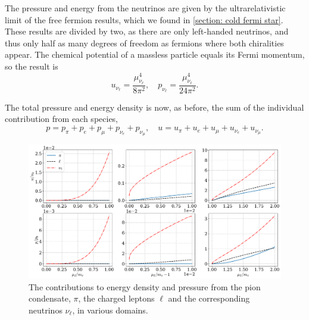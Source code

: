 The pressure and energy from the neutrinos are given by the ultrarelativistic limit of the free fermion results, which we found in \autoref{section: cold fermi star}.
These results are divided by two, as there are only left-handed neutrinos, and thus only half as many degrees of freedom as fermions where both chiralities appear.
The chemical potential of a massless particle equals its Fermi momentum, so the result is
%
\begin{equation}
    u_{\nu_\ell} = \frac{\mu_{\nu_\ell}^4}{8 \pi^2}, \quad 
    p_{\nu_\ell} = \frac{\mu_{\nu_\ell}^4}{24 \pi^2}.
\end{equation}
%

The total pressure and energy density is now, as before, the sum of the individual contribution from each species,
%
\begin{equation}
    \label{total energy and pressure neutrino}
    p = p_\pi + p_e + p_\mu + p_{\nu_e} + p_{\nu_\mu}, \quad
    u = u_\pi + u_e + u_\mu + u_{\nu_e} + u_{\nu_\mu}.
\end{equation}
%

\begin{figure}[!htb]
    \centering
    \includegraphics[width=\textwidth]{../scripts/figurer/neutrino_contributions.pdf}
    \caption{
        The contributions to energy density and pressure from the pion condensate, $\pi$, the charged leptons $\ell$ and the corresponding neutrinos $\nu_\ell$, in various domains.
        }
    \label{fig: contributions neutrino system}
\end{figure}

